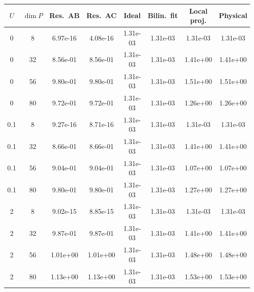 \begin{tabular}{cccccccc}
\hline
$U$ & $\dim P$ & Res.\ AB & Res.\ AC & Ideal & Bilin.\ fit & Local proj. & Physical \\
\hline
0 & 8 & 6.97e-16 & 4.08e-16 & 1.31e-03 & 1.31e-03 & 1.31e-03 & 1.31e-03 \\
0 & 32 & 8.56e-01 & 8.56e-01 & 1.31e-03 & 1.31e-03 & 1.41e+00 & 1.41e+00 \\
0 & 56 & 9.80e-01 & 9.80e-01 & 1.31e-03 & 1.31e-03 & 1.51e+00 & 1.51e+00 \\
0 & 80 & 9.72e-01 & 9.72e-01 & 1.31e-03 & 1.31e-03 & 1.26e+00 & 1.26e+00 \\
0.1 & 8 & 9.27e-16 & 8.71e-16 & 1.31e-03 & 1.31e-03 & 1.31e-03 & 1.31e-03 \\
0.1 & 32 & 8.66e-01 & 8.66e-01 & 1.31e-03 & 1.31e-03 & 1.41e+00 & 1.41e+00 \\
0.1 & 56 & 9.04e-01 & 9.04e-01 & 1.31e-03 & 1.31e-03 & 1.07e+00 & 1.07e+00 \\
0.1 & 80 & 9.80e-01 & 9.80e-01 & 1.31e-03 & 1.31e-03 & 1.27e+00 & 1.27e+00 \\
2 & 8 & 9.02e-15 & 8.85e-15 & 1.31e-03 & 1.31e-03 & 1.31e-03 & 1.31e-03 \\
2 & 32 & 9.87e-01 & 9.87e-01 & 1.31e-03 & 1.31e-03 & 1.41e+00 & 1.41e+00 \\
2 & 56 & 1.01e+00 & 1.01e+00 & 1.31e-03 & 1.31e-03 & 1.48e+00 & 1.48e+00 \\
2 & 80 & 1.13e+00 & 1.13e+00 & 1.31e-03 & 1.31e-03 & 1.53e+00 & 1.53e+00 \\
\hline
\end{tabular}
